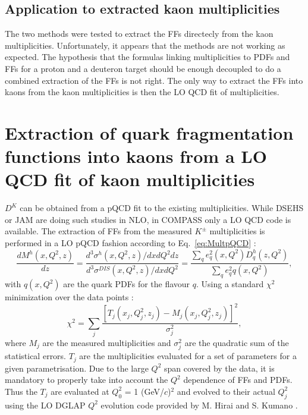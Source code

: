 \subsection{Application to extracted kaon multiplicities}

The two methods were tested to extract the FFs directecly from the kaon multiplicities. Unfortunately, it appears that the methods are not working as expected. The hypothesis that the formulas linking multiplicities to PDFs and FFs for a proton and a deuteron target should be enough decoupled to do a combined extraction of the FFs is not right. The only way to extract the FFs into kaons from the kaon multiplicities is then the LO QCD fit of multiplicities.


\section{Extraction of quark fragmentation functions into kaons from a LO QCD fit of kaon multiplicities}

$D^K$ can be obtained from a pQCD fit to the existing multiplicities. While DSEHS or JAM are doing such studies in NLO, in COMPASS only a LO QCD code is available. The extraction of FFs from the measured $K^{\pm}$ multiplicities is performed in a LO pQCD fashion according to Eq.~\ref{eq:MultpQCD} :
%
\begin{equation}
  \frac{dM^h(x,Q^2,z)}{dz} = \frac{d^3\sigma^h(x,Q^2,z)/dxdQ^2dz}{d^3\sigma^{DIS}(x,Q^2,z)/dxdQ^2} = \frac{\sum_q e^2_q(x,Q^2)D^h_q(z,Q^2)}{\sum_q e^2_qq(x,Q^2)},
\end{equation}
%
with $q(x,Q^2)$ are the quark PDFs for the flavour $q$. Using a standard $\chi^2$ minimization over the data points :
%
\begin{equation} \label{eq:MultpQCD}
  \chi^2 = \sum_j \frac{\left[T_j\left(x_j,Q^2_j,z_j\right) - M_j\left(x_j,Q^2_j,z_j\right)\right]^2}{\sigma^2_j},
\end{equation}
%
where $M_j$ are the measured multiplicities and $\sigma^2_j$ are the quadratic sum of the statistical errors. $T_j$ are the multiplicities evaluated for a set of parameters for a given parametrisation. Due to the large $Q^2$ span covered by the data, it is mandatory to properly take into account the $Q^2$ dependence of FFs and PDFs. Thus the $T_j$ are evaluated at $Q^2_0$ = 1 (GeV/$c$)$^2$ and evolved to their actual $Q^2_j$ using the LO DGLAP $Q^2$ evolution code provided by M. Hirai and S. Kumano \cite{HKNS}.

